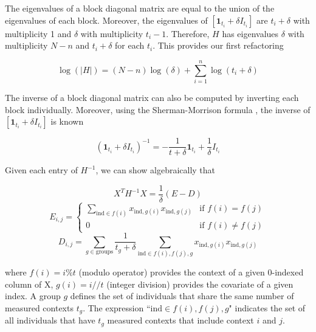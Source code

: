         The eigenvalues of a block diagonal matrix are equal to the union of the eigenvalues of each block. Moreover, the eigenvalues of $[\mathbf{1}_{t_i} + \delta I_{t_i}]$ are $t_i + \delta$ with multiplicity 1 and $\delta$ with multiplicity $t_i - 1$. Therefore, $H$ has eigenvalues $\delta$ with multiplicity $N-n$ and $t_i + \delta$ for each $t_i$. This provides our first refactoring
        
        \begin{equation}
            \log{(|H|)} = (N-n)\log{(\delta)} + \sum_{i=1}^n \log{(t_i + \delta)}
        \end{equation}
        
        The inverse of a block diagonal matrix can also be computed by inverting each block individually. Moreover, using the Sherman-Morrison formula \cite{ShermanMorrison}, the inverse of $[\mathbf{1}_{t_i} + \delta I_{t_i}]$ is known
        
        \begin{equation}
            (\mathbf{1}_{t_i} + \delta I_{t_i})^{-1} =  -\frac{1}{t+\delta}\mathbf{1}_{t_i} + \frac{1}{\delta} I_{t_i}
        \end{equation}
        
        \noindent Given each entry of $H^{-1}$, we can show algebraically that
        
        \begin{equation}
            X^T H^{-1} X = \frac{1}{\delta}(E - D)
        \end{equation}
        \begin{equation}
            E_{i,j} = 
            \begin{cases} 
                \sum\limits_{\text{ind} \in f(i)} x_{\text{ind},g(i)}x_{\text{ind},g(j)}&\mbox{if } f(i) = f(j) \\
                0 & \mbox{if } f(i) \neq f(j)
            \end{cases}
        \end{equation}
        \begin{equation}
            D_{i,j} = \sum\limits_{g \in \text{groups}} \frac{1}{t_g + \delta} \sum\limits_{\text{ind} \in f(i),f(j),g}x_{\text{ind},g(i)}x_{\text{ind},g(j)}
        \end{equation}
        
        \noindent where $f(i) = i \% t$ (modulo operator) provides the context of a given 0-indexed column of X, $g(i) = i // t$ (integer division) provides the covariate of a given index. A group $g$ defines the set of individuals that share the same number of measured contexts $t_g$. The expression ``$\text{ind} \in f(i),f(j),g$" indicates the set of all individuals that have $t_g$ measured contexts that include context $i$ and $j$. 
        
